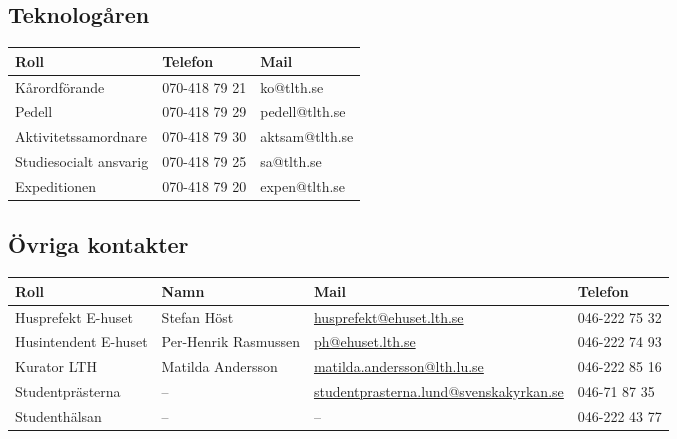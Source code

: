 \documentclass[pdfbookmarks,a4paper,11pt]{article}
\begin{document}
\subsection{Teknologåren}

\begin{table}[h]
\centering
\renewcommand{\arraystretch}{1.3}

\begin{tabularx}{\textwidth}{X X X}
\toprule
\textbf{Roll} & \textbf{Telefon} & \textbf{Mail} \\
\midrule
Kårordförande & 070-418 79 21 & ko@tlth.se \\
Pedell & 070-418 79 29 & pedell@tlth.se \\
Aktivitetssamordnare & 070-418 79 30 & aktsam@tlth.se \\
Studiesocialt ansvarig & 070-418 79 25 & sa@tlth.se \\
Expeditionen & 070-418 79 20 & expen@tlth.se \\
\bottomrule
\end{tabularx}
\end{table}

\subsection{Övriga kontakter}

\begin{table}[h]
\centering
\renewcommand{\arraystretch}{1.3}

\begin{tabularx}{\textwidth}{l l X l}
\toprule
\textbf{Roll} & \textbf{Namn} & \textbf{Mail} & \textbf{Telefon} \\
\midrule
Husprefekt E-huset & Stefan Höst & \url{husprefekt@ehuset.lth.se} & 046-222 75 32 \\
Husintendent E-huset & Per-Henrik Rasmussen & \url{ph@ehuset.lth.se} & 046-222 74 93 \\
Kurator LTH & Matilda Andersson & \url{matilda.andersson@lth.lu.se} & 046-222 85 16 \\
Studentprästerna & -- & \url{studentprasterna.lund@svenskakyrkan.se} & 046-71 87 35 \\
Studenthälsan & -- & -- & 046-222 43 77 \\
\bottomrule
\end{tabularx}
\end{table}
\end{document}
